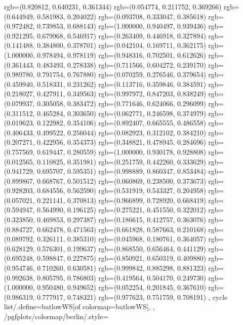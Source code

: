 {{{					rgb=(0.820812, 0.640231, 0.361344)
					rgb=(0.054774, 0.211752, 0.369266)
					rgb=(0.644949, 0.581983, 0.204022)
					rgb=(0.093708, 0.333047, 0.385618)
					rgb=(0.972482, 0.739853, 0.688143)
					rgb=(1.000000, 0.940497, 0.939436)
					rgb=(0.921295, 0.679968, 0.546917)
					rgb=(0.263409, 0.446918, 0.327894)
					rgb=(0.141488, 0.384800, 0.378701)
					rgb=(0.042104, 0.169711, 0.362175)
					rgb=(1.000000, 0.978494, 0.978119)
					rgb=(0.948316, 0.702501, 0.612626)
					rgb=(0.361443, 0.483493, 0.278338)
					rgb=(0.711566, 0.604272, 0.239170)
					rgb=(0.989780, 0.791754, 0.767880)
					rgb=(0.070259, 0.276546, 0.379654)
					rgb=(0.459940, 0.518331, 0.231262)
					rgb=(0.113716, 0.359846, 0.384591)
					rgb=(0.218027, 0.427911, 0.349563)
					rgb=(0.997972, 0.847203, 0.838249)
					rgb=(0.079937, 0.305058, 0.383472)
					rgb=(0.771646, 0.624066, 0.296099)
					rgb=(0.311512, 0.465284, 0.303650)
					rgb=(0.062771, 0.246598, 0.374979)
					rgb=(0.019623, 0.122982, 0.354106)
					rgb=(0.892407, 0.665555, 0.486558)
					rgb=(0.406433, 0.499522, 0.256044)
					rgb=(0.082923, 0.312102, 0.384210)
					rgb=(0.207271, 0.422956, 0.354373)
					rgb=(0.348821, 0.478945, 0.284696)
					rgb=(0.757569, 0.619447, 0.280559)
					rgb=(1.000000, 0.930178, 0.928808)
					rgb=(0.012565, 0.110825, 0.351981)
					rgb=(0.251759, 0.442260, 0.333629)
					rgb=(0.941729, 0.695707, 0.595351)
					rgb=(0.998889, 0.860347, 0.853484)
					rgb=(0.899867, 0.668767, 0.501512)
					rgb=(0.060869, 0.238500, 0.373673)
					rgb=(0.928203, 0.684556, 0.562590)
					rgb=(0.531919, 0.543327, 0.204958)
					rgb=(0.057021, 0.221141, 0.370813)
					rgb=(0.966899, 0.728920, 0.668419)
					rgb=(0.594947, 0.564990, 0.196125)
					rgb=(0.275221, 0.451550, 0.322012)
					rgb=(0.323850, 0.469853, 0.297387)
					rgb=(0.186615, 0.412757, 0.363076)
					rgb=(0.884727, 0.662478, 0.471563)
					rgb=(0.661828, 0.587663, 0.210168)
					rgb=(0.089792, 0.326111, 0.385310)
					rgb=(0.045968, 0.180761, 0.364057)
					rgb=(0.628129, 0.576301, 0.199637)
					rgb=(0.868550, 0.656464, 0.441129)
					rgb=(0.695248, 0.598847, 0.227875)
					rgb=(0.850921, 0.650319, 0.409880)
					rgb=(0.954746, 0.710260, 0.630581)
					rgb=(0.999842, 0.885298, 0.881323)
					rgb=(0.992638, 0.805795, 0.786803)
					rgb=(0.419564, 0.504170, 0.249730)
					rgb=(1.000000, 0.950480, 0.949652)
					rgb=(0.052254, 0.201845, 0.367610)
					rgb=(0.986319, 0.777917, 0.748321)
					rgb=(0.977623, 0.751759, 0.708191)
			},
		cycle list/.define={batlowWS}{[of colormap=batlowWS]},
		},
		/pgfplots/colormap/berlin/.style={
}}
